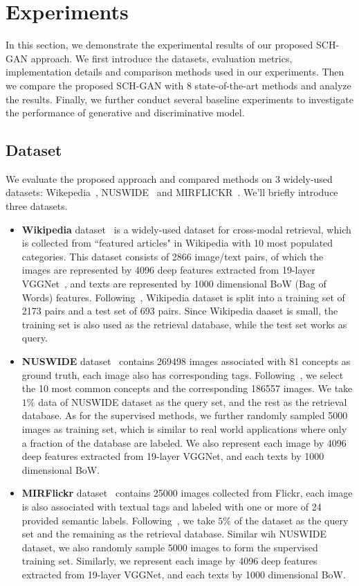 \documentclass[journal]{IEEEtran}
\begin{document}
\section{Experiments}
In this section, we demonstrate the experimental results of our proposed SCH-GAN approach. We first introduce the datasets, evaluation metrics, implementation details and comparison methods used in our experiments. Then we compare the proposed SCH-GAN with 8 state-of-the-art methods and analyze the results. Finally, we further conduct several baseline experiments to investigate the performance of generative and discriminative model.
\subsection{Dataset}
We evaluate the proposed approach and compared methods on 3 widely-used datasets: Wikepedia~\cite{wikipedia}, NUSWIDE~\cite{nuswide} and MIRFLICKR~\cite{mirflickr}. We'll briefly introduce three datasets.
\begin{itemize}
	\item \textbf{Wikipedia} dataset~\cite{wikipedia} is a widely-used dataset for cross-modal retrieval, which is collected from ``featured articles" in Wikipedia with 10 most populated categories. This dataset consists of 2866 image/text pairs, of which the images are represented by 4096 deep features extracted from 19-layer VGGNet~\cite{vgg19}, and texts are represented by 1000 dimensional BoW (Bag of Words) features. Following~\cite{SePH}, Wikipedia dataset is split into a training set of 2173 pairs and a test set of 693 pairs. Since Wikipedia daaset is small, the training set is also used as the retrieval database, while the test set works as query.
	\item \textbf{NUSWIDE} dataset~\cite{nuswide} contains 269498 images associated with 81 concepts as ground truth, each image also has corresponding tags. Following~\cite{SePH}, we select the 10 most common concepts and the corresponding 186557 images. We take $1\%$ data of NUSWIDE dataset as the query set, and the rest as the retrieval database. As for the supervised methods, we further randomly sampled 5000 images as training set, which is similar to real world applications where only a fraction of the database are labeled. We also represent each image by 4096 deep features extracted from 19-layer VGGNet, and each texts by 1000 dimensional BoW.
	\item \textbf{MIRFlickr} dataset~\cite{mirflickr} contains 25000 images collected from Flickr, each image is also associated with textual tags and labeled with one or more of 24  provided semantic labels. Following~\cite{SePH}, we take $5\%$ of the dataset as the query set and the remaining as the retrieval database. Similar wih NUSWIDE dataset, we also randomly sample 5000 images to form the supervised training set. Similarly, we represent each image by 4096 deep features extracted from 19-layer VGGNet, and each texts by 1000 dimensional BoW.
\end{itemize}
\end{document}
